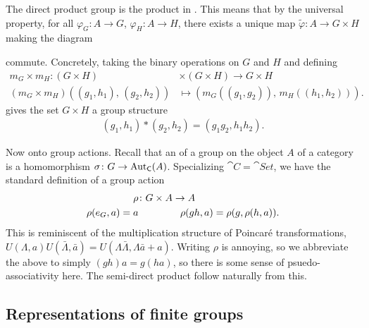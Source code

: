 \documentclass[11pt]{article}
\begin{document}
The direct product group is the product in . This means that by 
the universal property, for all $\varphi_G \colon A \to G$, $\varphi_{H} \colon A \to H$,
there exists a unique map $\widetilde{\varphi} \colon A \to G \times H$
making the diagram

\begin{center}
\end{center}

\noin
commute. Concretely, taking the binary operations on $G$
and $H$ and defining 
\begin{align*}
    m_G \times m_H \colon (G \times H) & \times (G \times H) \to G \times H\\
    (m_G \times m_H)((g_1, h_1), \, (g_2, h_2)) & \mapsto (m_G((g_1, g_2)), \, m_H((h_1, h_2))).
\end{align*}
gives the set $G \times H$ a group structure
\begin{align*}
    (g_1, h_1) * (g_2, h_2) = (g_1 g_2, h_1 h_2).
\end{align*}

Now onto group actions. Recall that an  of a 
group on the object $A$ of a category  is a homomorphism
$\sigma \colon G \to \operatorname{Aut}_{\text{\sffamily{C}}}(A)$. Specializing 
$\cat{C} = \cat{Set}$, we have the standard definition of a group action
\begin{align*}
    \rho & \colon G \times A \to A\\
    \rho(e_G, a) = a
    & \hspace{1.5cm}
    \rho(gh, a) = \rho(g, \rho(h, a)).
\end{align*}
This is reminiscent of the multiplication structure of 
Poincaré transformations, 
$U(\Lambda, a)U(\bar{\Lambda}, \bar{a}) = U(\Lambda \bar{\Lambda}, \Lambda \bar{a} + a)$.
Writing $\rho$ is annoying, so we abbreviate the above
to simply $(gh)a = g(ha)$, so there is some sense of psuedo-associativity
here. The semi-direct product follow naturally from this.

\subsection{Representations of finite groups}
\end{document}
